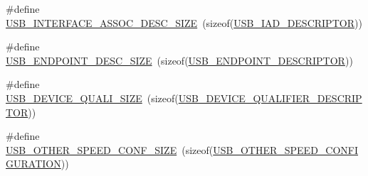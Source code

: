 \begin{DoxyCompactItemize}
$$\#define \hyperlink{group___u_s_b_d___core_gae377b4fc3e66e90afb99e60fa5cc0a94}{U\+S\+B\+\_\+\+I\+N\+T\+E\+R\+F\+A\+C\+E\+\_\+\+A\+S\+S\+O\+C\+\_\+\+D\+E\+S\+C\+\_\+\+S\+I\+ZE}~(sizeof(\hyperlink{group___u_s_b_d___core_ga6b053e842151d5c5dcdace597e45a36b}{U\+S\+B\+\_\+\+I\+A\+D\+\_\+\+D\+E\+S\+C\+R\+I\+P\+T\+OR}))
\item 
\#define \hyperlink{group___u_s_b_d___core_ga317f2697db907bff3f818a644d231c08}{U\+S\+B\+\_\+\+E\+N\+D\+P\+O\+I\+N\+T\+\_\+\+D\+E\+S\+C\+\_\+\+S\+I\+ZE}~(sizeof(\hyperlink{group___u_s_b_d___core_ga652b2871268bd903653cbff0f3448a6e}{U\+S\+B\+\_\+\+E\+N\+D\+P\+O\+I\+N\+T\+\_\+\+D\+E\+S\+C\+R\+I\+P\+T\+OR}))
\item 
\#define \hyperlink{group___u_s_b_d___core_ga038630c136094c9f727b62cb81a9a186}{U\+S\+B\+\_\+\+D\+E\+V\+I\+C\+E\+\_\+\+Q\+U\+A\+L\+I\+\_\+\+S\+I\+ZE}~(sizeof(\hyperlink{group___u_s_b_d___core_ga4460a327f0c59c1d44e550efcff1eb00}{U\+S\+B\+\_\+\+D\+E\+V\+I\+C\+E\+\_\+\+Q\+U\+A\+L\+I\+F\+I\+E\+R\+\_\+\+D\+E\+S\+C\+R\+I\+P\+T\+OR}))
\item 
\#define \hyperlink{group___u_s_b_d___core_gab7288d5e0e645952c8c156182f3baa11}{U\+S\+B\+\_\+\+O\+T\+H\+E\+R\+\_\+\+S\+P\+E\+E\+D\+\_\+\+C\+O\+N\+F\+\_\+\+S\+I\+ZE}~(sizeof(\hyperlink{group___u_s_b_d___core_ga808d47bcf11e648d95efc88e330fabc5}{U\+S\+B\+\_\+\+O\+T\+H\+E\+R\+\_\+\+S\+P\+E\+E\+D\+\_\+\+C\+O\+N\+F\+I\+G\+U\+R\+A\+T\+I\+ON}))
\end{DoxyCompactItemize}
